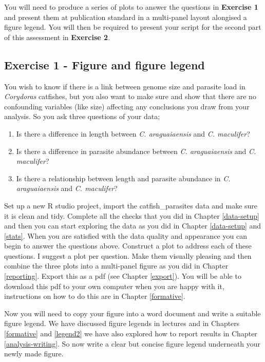 \documentclass[
]{book}
\providecommand{\tightlist}{%
  \setlength{\itemsep}{0pt}\setlength{\parskip}{0pt}}
\begin{document}
You will need to produce a series of plots to answer the questions in \textbf{Exercise 1} and present them at publication standard in a multi-panel layout alongised a figure legend. You will then be required to present your script for the second part of this assessment in \textbf{Exercise 2}.

\hypertarget{exercise-1---figure-and-figure-legend}{%
\subsection{Exercise 1 - Figure and figure legend}\label{exercise-1---figure-and-figure-legend}}

You wish to know if there is a link between genome size and parasite load in \emph{Corydoras} catfishes, but you also want to make sure and show that there are no confounding variables (like size) affecting any conclusions you draw from your analysis. So you ask three questions of your data;

\begin{enumerate}
\def\labelenumi{\arabic{enumi})}
\tightlist
\item
  Is there a difference in length between \emph{C. araguaiaensis} and \emph{C. maculifer}?
\item
  Is there a difference in parasite abundance between \emph{C. araguaiaensis} and \emph{C. maculifer}?
\item
  Is there a relationship between length and parasite abundance in \emph{C. araguaiaensis} and \emph{C. maculifer}?
\end{enumerate}

Set up a new R studio project, import the catfish\_parasites data and make sure it is clean and tidy. Complete all the checks that you did in Chapter \ref{data-setup} and then you can start exploring the data as you did in Chapter \ref{data-setup} and \ref{stats}. When you are satisfied with the data quality and appearance you can begin to answer the questions above. Construct a plot to address each of these questions. I suggest a plot per question. Make them visually pleasing and then combine the three plots into a multi-panel figure as you did in Chapter \ref{reporting}. Export this as a pdf (see Chapter \ref{export}). You will be able to download this pdf to your own computer when you are happy with it, instructions on how to do this are in Chapter \ref{formative}.

Now you will need to copy your figure into a word document and write a suitable figure legend. We have discussed figure legends in lectures and in Chapters \ref{formative} and \ref{legend2} we have also explored how to report results in Chapter \ref{analysis-writing}. So now write a clear but concise figure legend underneath your newly made figure.
\end{document}
